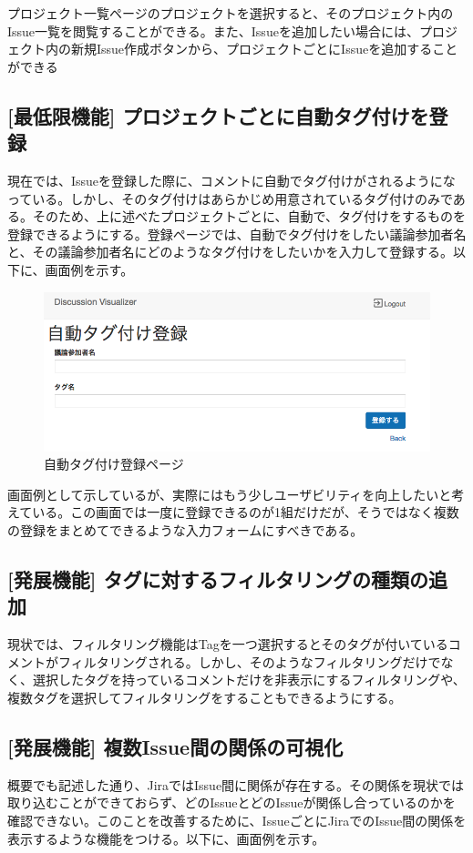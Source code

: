 \documentclass[12pt, oneside]{jreport}
\begin{document}
		プロジェクト一覧ページのプロジェクトを選択すると、そのプロジェクト内のIssue一覧を閲覧することができる。また、Issueを追加したい場合には、プロジェクト内の新規Issue作成ボタンから、プロジェクトごとにIssueを追加することができる
		
		\subsection{[最低限機能] プロジェクトごとに自動タグ付けを登録}
		現在では、Issueを登録した際に、コメントに自動でタグ付けがされるようになっている。しかし、そのタグ付けはあらかじめ用意されているタグ付けのみである。そのため、上に述べたプロジェクトごとに、自動で、タグ付けをするものを登録できるようにする。登録ページでは、自動でタグ付けをしたい議論参加者名と、その議論参加者名にどのようなタグ付けをしたいかを入力して登録する。以下に、画面例を示す。
		\begin{figure}[H]
		\centering
		\includegraphics[width=17cm,bb=500 300 -200 27]{TagAdd.png}
		\caption{自動タグ付け登録ページ}
		\end{figure}
		
		画面例として示しているが、実際にはもう少しユーザビリティを向上したいと考えている。この画面では一度に登録できるのが1組だけだが、そうではなく複数の登録をまとめてできるような入力フォームにすべきである。

		\subsection{[発展機能] タグに対するフィルタリングの種類の追加}
		現状では、フィルタリング機能はTagを一つ選択するとそのタグが付いているコメントがフィルタリングされる。しかし、そのようなフィルタリングだけでなく、選択したタグを持っているコメントだけを非表示にするフィルタリングや、複数タグを選択してフィルタリングをすることもできるようにする。

		\subsection{[発展機能] 複数Issue間の関係の可視化}
		概要でも記述した通り、JiraではIssue間に関係が存在する。その関係を現状では取り込むことができておらず、どのIssueとどのIssueが関係し合っているのかを確認できない。このことを改善するために、IssueごとにJiraでのIssue間の関係を表示するような機能をつける。以下に、画面例を示す。
		
\end{document}
